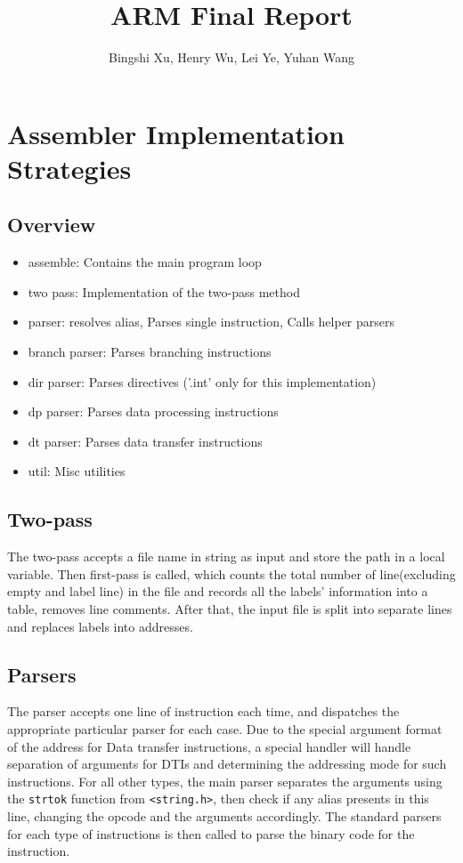 \documentclass[11pt]{article}
\begin{document}
\title{ARM Final Report}
\author{Bingshi Xu, Henry Wu, Lei Ye, Yuhan Wang}

\maketitle

\section{Assembler Implementation Strategies}

\subsection{Overview}
\begin{itemize}
	\item assemble: Contains the main program loop
	\item two pass: Implementation of the two-pass method
	\item parser: resolves alias, Parses single instruction, Calls helper parsers
	\item branch parser: Parses branching instructions
	\item dir parser: Parses directives ('.int' only for this implementation)
	\item dp parser: Parses data processing instructions
	\item dt parser: Parses data transfer instructions
	\item util: Misc utilities
\end{itemize}

\subsection{Two-pass}
The two-pass accepts a file name in string as input and store the path in a
local variable. Then first-pass is called, which counts the total number of
line(excluding empty and label line) in the file and records all the labels'
information into a table, removes line comments. After that, the input file is
split into separate lines and replaces labels into addresses.

\subsection{Parsers}
The parser accepts one line of instruction each time, and dispatches the
appropriate particular parser for each case. Due to the special argument format
of the address for Data transfer instructions, a special handler will handle
separation of arguments for DTIs and determining the addressing mode for such
instructions. For all other types, the main parser separates the arguments
using the \texttt{strtok} function from \texttt{<string.h>}, then check if any
alias presents in this line, changing the opcode and the arguments accordingly.
The standard parsers for each type of instructions is then called to parse the
binary code for the instruction.
\end{document}
